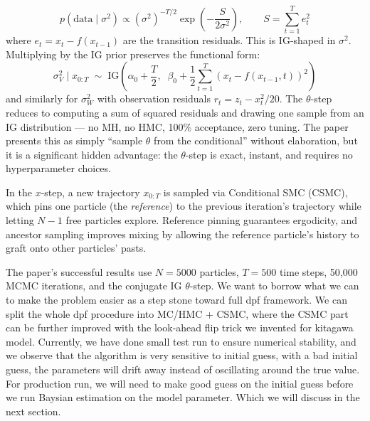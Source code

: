 \documentclass{article}
\begin{document}
\begin{equation}
    p(\text{data} \mid \sigma^2) \propto (\sigma^2)^{-T/2} \exp\!\left(-\frac{S}{2\sigma^2}\right), \qquad S = \sum_{t=1}^{T} e_t^2
\end{equation}
where $e_t = x_t - f(x_{t-1})$ are the transition residuals. This is IG-shaped in $\sigma^2$. Multiplying by the IG prior preserves the functional form:
\begin{equation}
    \sigma_V^2 \mid x_{0:T} \;\sim\; \text{IG}\!\left(\alpha_0 + \frac{T}{2},\;\; \beta_0 + \frac{1}{2}\sum_{t=1}^{T}\!\left(x_t - f(x_{t-1},t)\right)^2\right)
\end{equation}
and similarly for $\sigma_W^2$ with observation residuals $r_t = z_t - x_t^2/20$. The $\theta$-step reduces to computing a sum of squared residuals and drawing one sample from an IG distribution --- no MH, no HMC, 100\% acceptance, zero tuning. The paper presents this as simply ``sample $\theta$ from the conditional'' without elaboration, but it is a significant hidden advantage: the $\theta$-step is exact, instant, and requires no hyperparameter choices.

In the $x$-step, a new trajectory $x_{0:T}$ is sampled via Conditional SMC (CSMC)\cite{Andrieu2010,Lindsten2014}, which pins one particle (the \textit{reference}) to the previous iteration's trajectory while letting $N-1$ free particles explore. Reference pinning guarantees ergodicity, and ancestor sampling\cite{Lindsten2014} improves mixing by allowing the reference particle's history to graft onto other particles' pasts.

The paper's successful results use $N = 5000$ particles, $T = 500$ time steps, 50,000 MCMC iterations, and the conjugate IG $\theta$-step. We want to borrow what we can to make the problem easier as a step stone toward full dpf framework. We can split the whole dpf procedure into MC/HMC + CSMC, where the CSMC part can be further improved with the look-ahead flip trick we invented for kitagawa model. Currently, we have done small test run  to ensure numerical stability, and we observe that the algorithm is very sensitive to initial guess, with a bad initial guess, the parameters will drift away instead of oscillating around the true value. For production run, we will need to make good guess on the initial guess before we run Baysian estimation on the model parameter. Which we will discuss in the next section.
\end{document}
